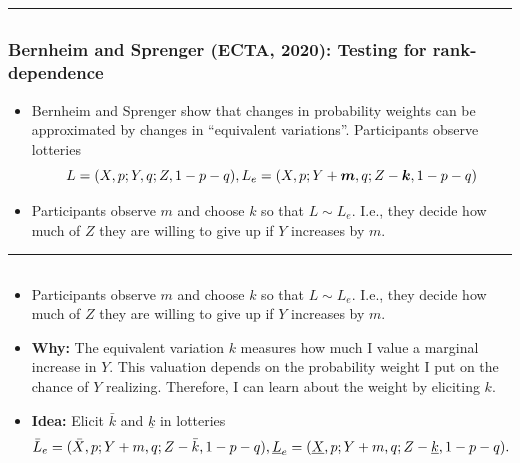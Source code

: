 \documentclass[
  letterpaper,
  DIV=11,
  numbers=noendperiod]{scrartcl}
\providecommand{\tightlist}{%
  \setlength{\itemsep}{0pt}\setlength{\parskip}{0pt}}\usepackage{longtable,booktabs,array}
\begin{document}
\begin{center}\rule{0.5\linewidth}{0.5pt}\end{center}

\subsection{}\label{section-14}

\subsubsection{Bernheim and Sprenger (ECTA, 2020): Testing for
rank-dependence}\label{bernheim-and-sprenger-ecta-2020-testing-for-rank-dependence}

\begin{itemize}
\tightlist
\item
  Bernheim and Sprenger show that changes in probability weights can be
  approximated by changes in ``equivalent variations''. Participants
  observe lotteries \[
  L = (X, p; Y, q; Z, 1-p-q), \\
  L_e = (X, p; Y + \boldsymbol{m}, q; Z-\boldsymbol{k},1-p-q)
  \]
\item
  Participants observe \(m\) and choose \(k\) so that \(L\sim L_e\).
  I.e., they decide how much of \(Z\) they are willing to give up if
  \(Y\) increases by \(m.\)
\end{itemize}

\begin{center}\rule{0.5\linewidth}{0.5pt}\end{center}

\subsection{}\label{section-15}

\begin{itemize}
\tightlist
\item
  Participants observe \(m\) and choose \(k\) so that \(L\sim L_e\).
  I.e., they decide how much of \(Z\) they are willing to give up if
  \(Y\) increases by \(m.\)
\item
  \textbf{Why:} The equivalent variation \(k\) measures how much I value
  a marginal increase in \(Y\). This valuation depends on the
  probability weight I put on the chance of \(Y\) realizing. Therefore,
  I can learn about the weight by eliciting \(k\).
\item
  \textbf{Idea:} Elicit \(\bar{k}\) and \(\underline{k}\) in lotteries
  \[
  \bar{L}_e = (\bar{X}, p; Y + m, q; Z-\bar{k},1-p-q), \\
  \underline{L}_e = (\underline{X}, p; Y + m, q; Z-\underline{k},1-p-q).
  \]
\end{itemize}
\end{document}
